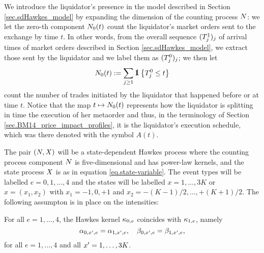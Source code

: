 \documentclass[10pt, article,table]{article}
\begin{document}
We introduce the liquidator's presence in the model described in Section \ref{sec.sdHawkes_model} by expanding the dimension of the counting process $\multiCountingProc$: we let the zero-th component $\countingProc[0](t)$ count the liquidator's market orders sent to the exchange by time $t$. In other words, from the overall sequence $(\arrivalTimes[1]_j)_j$ of arrival times of market orders described in Section \ref{sec.sdHawkes_model}, we extract those sent by the liquidator and we label them as $(\arrivalTimes[0]_j)_j$; we then let 
\begin{equation*}
 \countingProc[0](t):=\sum_{j\geq 1}\one \left\lbrace \arrivalTimes[0]_j \leq t \right\rbrace
\end{equation*}
count the number of trades initiated by the liquidator that happened before or at time $t$. Notice that the map $t\mapsto \countingProc[0](t)$ represents how the liquidator is splitting in time the execution of her metaorder and thus, in the terminology of Section \ref{sec.BM14_price_impact_profiles}, it is the liquidator's execution schedule, which was there denoted with the symbol $A(t)$.

The pair $(\multiCountingProc, \stateVariable)$ will be a state-dependent Hawkes process where the counting process component $\multiCountingProc$ is five-dimensional and has power-law kernels, and the state process $\stateVariable$ is as in equation \eqref{eq.state-variable}. The event types will be labelled $e=0,1,\dots,4$ and the states will be labelled $x=1,\dots,3K$ or $x=(x_1,x_2)$ with $x_1 = -1,0,+1$ and $x_2 = -(K-1)/2,\dots,+(K+1)/2$.  The following assumpton is in place on the intensities:
\begin{assumption}\label{assumption.imp_and_dec_coef_from_liquidator}
 For all $e=1,\dots,4$, the Hawkes kernel $\hawkesKernel_{0,e}$ coincides with  $\hawkesKernel_{1,e}$, namely
 \begin{equation*}
  \impCoef_{0,\xone,e}=\impCoef_{1,\xone,e} , \quad \decCoef_{0,\xone,e}= \decCoef_{1,\xone,e}, 
 \end{equation*}
for all $e=1,\dots,4$ and all $\xone = 1,\dots, 3K$. 
\end{assumption}
\end{document}
